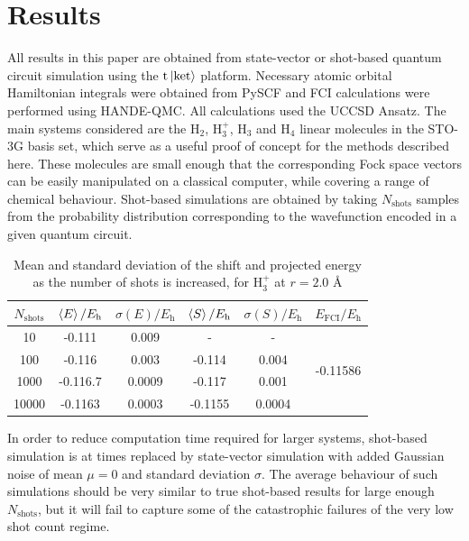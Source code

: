 \documentclass[%
 reprint,
 amsmath,amssymb,
 aps,
]{revtex4-2}
\begin{document}
\section{Results}\label{sec:res}
All results in this paper are obtained from state-vector or shot-based quantum circuit simulation using the $\mathrm{t}\ket{\mathrm{ket}}$ platform.\cite{Sivarajah2021} Necessary atomic orbital Hamiltonian integrals were obtained from PySCF\cite{Sun2020} and FCI calculations were performed using HANDE-QMC.\cite{Spencer2019} All calculations used the UCCSD Ansatz. The main systems considered are the H$_2$, H$_3^+$, H$_3$ and H$_4$ linear molecules in the STO-3G basis set,\cite{Hehre1969} which serve as a useful proof of concept for the methods described here. These molecules are small enough that the corresponding Fock space vectors can be easily manipulated on a classical computer, while covering a range of chemical behaviour. Shot-based simulations are obtained by taking $N_\mathrm{shots}$ samples from the probability distribution corresponding to the wavefunction encoded in a given quantum circuit. 
\begin{table}
    \centering
    \begin{tabular}{c|c|c|c|c|c}
       $N_\mathrm{shots}$  &  $\braket{E}/E_\mathrm{h}$ & $\sigma (E)/E_\mathrm{h}$ & $\braket{S}/E_\mathrm{h}$ & $\sigma(S)/E_\mathrm{h}$&$E_\mathrm{FCI}/E_\mathrm{h}$\\
       \hline
         10 & -0.111 & 0.009 & - & - &\multirow{4}{*}{-0.11586}\\
         100 & -0.116& 0.003& -0.114& 0.004& \\
         1000 & -0.116.7& 0.0009 & -0.117& 0.001& \\
         10000 & -0.1163 & 0.0003& -0.1155 & 0.0004& \\
         \hline
    \end{tabular}
    \caption{\small \justifying Mean and standard deviation of the shift and projected energy as the number of shots is increased, for H$_3^+$ at $r = 2.0$ \r{A}}
    \label{tab:variance}
\end{table}
In order to reduce computation time required for larger systems, shot-based simulation is at times replaced by state-vector simulation with added Gaussian noise of mean $\mu = 0$ and standard deviation $\sigma$. The average behaviour of such simulations should be very similar to true shot-based results for large enough $N_\mathrm{shots}$, but it will fail to capture some of the catastrophic failures of the very low shot count regime.
\end{document}
